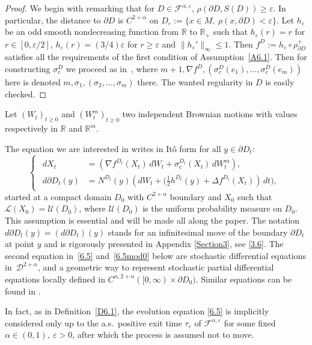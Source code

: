 \documentclass[JEP,XML,SOM,Unicode,NoFloatCountersInSection,published]{cedram}
\theoremstyle{plain}
\theoremstyle{definition}
\newcommand{\RR}{{\mathbb R}}
\newcommand{\SD}{{\mathscr D}}
\newcommand{\SL}{{\mathscr L}}
\newcommand{\SU}{{\mathscr U}}
\let\a\alpha
\let\e\varepsilon
\let\n\nabla
\let\s\sigma
\let\pa\partial
\newcommand{\cF}{\mathcal{F}}
\begin{document}
\begin{proof}
We begin with remarking that for $D\in \cF^{\alpha,\e}$, $\rho(\partial D, S(D))\ge \e$. In particular, the distance to $\partial D$ is $C^{2+\a}$ on $D_\e:=\{x\in M,\ \rho(x,\partial D)< \e\}$. Let $h_\e$ be an odd smooth nondecreasing function from $\RR$ to $\RR_+$ such that $h_\e(r)=r$ for $r\in [0,\e/2]$, $h_\e(r)=(3/4)\e$ for $r\ge \e$ and $\|h_\e'\|_\infty\le 1$. Then $f^D:=h_\e\circ {\rho^{+}_{\partial D}}$ satisfies all the requirements of the first condition of Assumption~\ref{A6.1}. Then for constructing $\s_c^D$ we proceed as in~\cite[Prop.\,3.2]{Arnaudon-Li:17}, where $m+1,\n f^D,(\s_c^D(e_1),\ldots, \s_c^D(e_m))$ here is denoted $m,\s_1,(\s_2,\ldots, \s_m)$ there. The wanted regularity in $D$ is easily checked.
\end{proof}

Let $(W_t)_{t\geq 0}$ and $(W_t^m)_{t\geq 0}$ two independent Brownian motions with values respectively in $\RR$ and $\RR^m$.

The equation we are interested in writes in Itô form for all $y\in \partial D_t$:
\begin{equation}
\label{6.5}
\begin{cases}
\begin{aligned}
dX_t&=\left(\n f^{D_t}(X_t) \, dW_t+ \sigma_{\mathrm c}^{D_t}(X_t)\, dW_t^m\right),\\
d\partial D_t(y)&=N^{D_t}(y)\left(dW_t
+\bigl(\tfrac12 h^{D_t}(y)+\Delta f^{D_t}(X_t)\right)\,dt\bigr),
\end{aligned}
\end{cases}
\end{equation}
started at
a compact domain $D_0$ with $C^{2+\a}$ boundary and $X_0$ such that $\SL(X_0)=\SU(D_0)$, where $\SU(D_0)$ is the uniform probability measure on $D_0$. This assumption is essential and will be made all along the paper.
The notation $d\partial D_t(y)=(d\partial D_t)(y)$ stands for an infinitesimal move of the boundary $\pa D_t$ at point $y$ and is rigorously presented in Appendix \ref{Section3}, see \eqref{3.6}. The second equation in~\eqref{6.5} and~\eqref{6.5mod0} below are stochastic differential equations in~$\SD^{2+\a}$, and a geometric way to represent stochastic partial differential equations locally defined in $C^{\alpha,2+\alpha}([0,\infty)\times\partial D_0)$. Similar equations can be found in \cite[App.\,A.2]{GGLS:22}.

In fact, as in Definition~\ref{D6.1}, the evolution equation \eqref{6.5} is implicitly considered only up to the a.s.\ positive exit time $\tau_\e$ of $\cF^{\a,\e}$ for some fixed $\a\in(0,1),\ \e>0$, after which the process
is assumed not to move.
\end{document}
